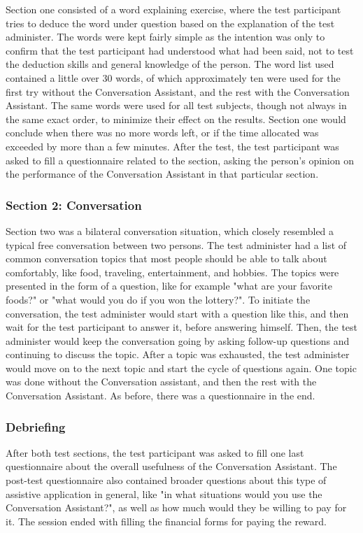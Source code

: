 \documentclass[english, 12pt, a4paper, pdftex, elec, utf8]{aaltothesis}
\begin{document}
Section one consisted of a word explaining exercise, where the test participant tries to deduce the word under question based on the explanation of the test administer. The words were kept fairly simple as the intention was only to confirm that the test participant had understood what had been said, not to test the deduction skills and general knowledge of the person. The word list used contained a little over 30 words, of which approximately ten were used for the first try without the Conversation Assistant, and the rest with the Conversation Assistant. The same words were used for all test subjects, though not always in the same exact order, to minimize their effect on the results. Section one would conclude when there was no more words left, or if the time allocated was exceeded by more than a few minutes. After the test, the test participant was asked to fill a questionnaire related to the section, asking the person's opinion on the performance of the Conversation Assistant in that particular section.

\subsubsection{Section 2: Conversation}

Section two was a bilateral conversation situation, which closely resembled a typical free conversation between two persons. The test administer had a list of common conversation topics that most people should be able to talk about comfortably, like food, traveling, entertainment, and hobbies. The topics were presented in the form of a question, like for example "what are your favorite foods?" or "what would you do if you won the lottery?". To initiate the conversation, the test administer would start with a question like this, and then wait for the test participant to answer it, before answering himself. Then, the test administer would keep the conversation going by asking follow-up questions and continuing to discuss the topic. After a topic was exhausted, the test administer would move on to the next topic and start the cycle of questions again. One topic was done without the Conversation assistant, and then the rest with the Conversation Assistant. As before, there was a questionnaire in the end.

\subsubsection{Debriefing}

After both test sections, the test participant was asked to fill one last questionnaire about the overall usefulness of the Conversation Assistant. The post-test questionnaire also contained broader questions about this type of assistive application in general, like "in what situations would you use the Conversation Assistant?", as well as how much would they be willing to pay for it. The session ended with filling the financial forms for paying the reward.
\end{document}
